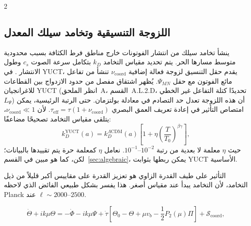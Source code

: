 \documentclass[11pt,a4paper]{article}
\begin{document}
\begin{multicols}{2}
		\subsection{اللزوجة التنسيقية وتخامد سيلك المعدل}
		
		ينشأ تخامد سيلك من انتشار الفوتونات خارج مناطق فرط الكثافة بسبب محدودية متوسط مسارها الحر. يتم تحديد مقياس التخامد $k_D$ بتكامل سرعة الصوت $c_s$ وطول الانتشار \cite{Silk1968}. في YUCT، يقدم حقل التنسيق لزوجة فعالة إضافية $\nu_{\mathrm{coord}}$ تنشأ من تفاعل مائع الفوتون مع حقل $\Psi_{MN}$. يُظهر اشتقاق مفصل من حدود الازدواج بين القطاعات للاغرانجيان YUCT (انظر الملحق~A، القسم~A.L.2.D، تحديدًا كتلة التفاعل غير الخطي \(L_{\Psi}\)) أن هذه اللزوجة تعدل حد التصادم في معادلة بولتزمان. حتى الرتبة الرئيسية، يمكن امتصاص التأثير في إعادة تعريف العمق البصري $\tau_{\mathrm{eff}} = \tau (1 + \nu_{\mathrm{coord}})$. لأن $\nu_{\mathrm{coord}} \ll 1$، يتلقى مقياس التخامد تصحيحًا مضاعفًا:
		\begin{equation}
			k_D^{\text{YUCT}}(a) = k_D^{\Lambda\text{CDM}}(a) \left[1 + \eta \left(\frac{T}{T_0}\right)^{\beta\gamma}\right],
			\label{eq:kD}
		\end{equation}
		حيث $\eta$ معلمة لا بعدية من رتبة $10^{-2}$--$10^{-1}$. نعامل $\eta$ كمعلمة حرة يتم تقييدها بالبيانات؛ لكن، كما هو مبين في القسم~\ref{sec:algebraic}، يمكن ربطها بثوابت YUCT الأساسية.
		
		التأثير على طيف القدرة الزاوي هو تعزيز القدرة على مقاييس أكبر قليلاً من ذيل التخامد، لأن التخامد يبدأ عند مقياس أصغر. هذا يفسر بشكل طبيعي الفائض الذي لاحظه Planck عند $\ell \sim 2000$--$2500$.
		
	\end{multicols}
	
	\begin{equation}
		\dot{\Theta} + ik\mu\Theta = -\dot{\Phi} - ik\mu\Psi + \dot{\tau}\left[\Theta_0 - \Theta + \mu v_b - \frac{1}{2}P_2(\mu)\Pi\right] + \mathcal{S}_{\mathrm{coord}},
		\label{eq:boltzmann}
	\end{equation}
	
\end{document}
